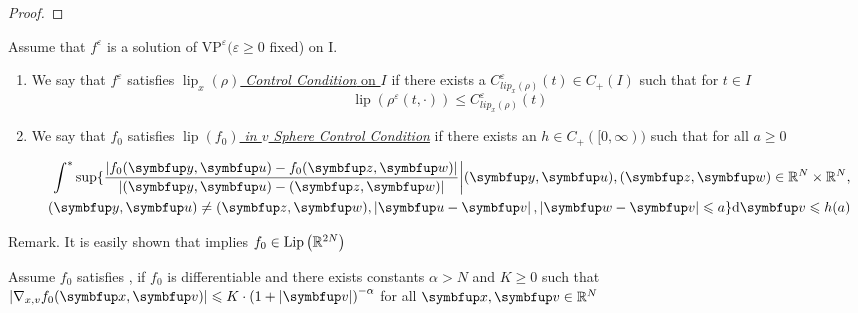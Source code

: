 \begin{lemma}
\begin{proof}
    
\end{proof}



\begin{assumption}

    Assume that $f^{\varepsilon}$ is a solution of $\text{VP}^{\varepsilon}(\varepsilon \geqslant 0$ fixed) on I.
    \begin{enumerate}
        \item  We say that $f^{\varepsilon}$ satisfies \underline{\textit{$\operatorname{lip}_x(\rho)$ Control Condition} on $I$} if there exists a $C_{lip_x(\rho)}^{\varepsilon}(t) \in C_{+}(I)$ such that for $t \in I$
        \begin{equation}
            \label{eq:lipx_rho_control}
            \operatorname{lip}\left(\rho^{\varepsilon}(t, \cdot)\right) \leqslant C_{lip_x(\rho)}^{\varepsilon}(t)
        \end{equation}
        \item We say that $f_{0}$ satisfies \underline{\textit{$\operatorname{lip}(f_0)$ in $v$ Sphere Control Condition}} if there exists an $h \in C_{+}([0, \infty))$ such that for all $a \geqslant 0$

        \begin{equation}
            \begin{aligned}
                \label{eq:lip_Of_f0_in_vsphere_control}
                \int^* \sup \{
                    \frac{|f_{0}(\vect{y}, \vect{u})-f_{0}(\vect{z}, \vect{w})|}{| (\vect{y}, \vect{u})-(\vect{z}, \vect{w})|}  \bigg| (\vect{y},\vect{u}), (\vect{z},\vect{w}) \in \bbR^{N}\times \bbR^{N},\\ (\vect{y},\vect{u}) \neq (\vect{z},\vect{w}),             \left|\vect{u}-\vv\right|,\left|\vect{w}-\vv\right| \leqslant a\} \mathrm{d} \vv \leqslant h(a)
            \end{aligned}
        \end{equation}
        
    \end{enumerate}
\end{assumption}

Remark. It is easily shown that \lipOffVsphere implies $f_{0} \in \operatorname{Lip}\left({\mathbb{R}}^{2 N}\right)$


\begin{lemma}
    Assume $f_{0}$ satisfies \lipOffVsphere, if $f_{0}$ is differentiable and there exists constants $\alpha > N$ and $K \geqslant 0$ such that $\left|\nabla_{x,v}f_{0}(\vx,\vv)\right| \leqslant K \cdot\left(1+\left|\vv\right|\right)^{-\alpha}$ for all $\vx,\vv \in \bbR^{N}$
\end{lemma}


\end{lemma}
